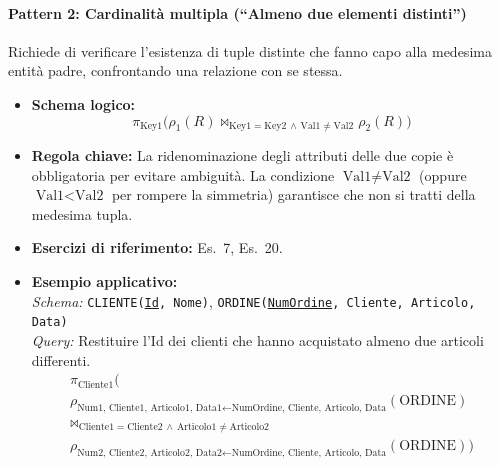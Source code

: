 \documentclass[12pt]{extarticle}
\begin{document}
\paragraph{Pattern 2: Cardinalità multipla (``Almeno due elementi distinti'')}
Richiede di verificare l'esistenza di tuple distinte che fanno capo alla medesima entità padre, confrontando una relazione con se stessa.
\begin{itemize}
    \item \textbf{Schema logico:}
    \[
    \pi_{\text{Key1}} \big( \rho_1(R) \bowtie_{\text{Key1} = \text{Key2} \,\land\, \text{Val1} \neq \text{Val2}} \rho_2(R) \big)
    \]
    \item \textbf{Regola chiave:} La ridenominazione degli attributi delle due copie è obbligatoria per evitare ambiguità. La condizione $\text{Val1} \neq \text{Val2}$ (oppure $\text{Val1} < \text{Val2}$ per rompere la simmetria) garantisce che non si tratti della medesima tupla.
    \item \textbf{Esercizi di riferimento:} Es.~7, Es.~20.
    \item \textbf{Esempio applicativo:}\\
    \textit{Schema:} \texttt{CLIENTE(\underline{Id}, Nome)}, \texttt{ORDINE(\underline{NumOrdine}, Cliente, Articolo, Data)}\\
    \textit{Query:} Restituire l'Id dei clienti che hanno acquistato almeno due articoli differenti.
    \[
    \begin{gathered}
    \pi_{\text{Cliente1}} \Big( \\
    \rho_{\text{Num1, Cliente1, Articolo1, Data1} \leftarrow \text{NumOrdine, Cliente, Articolo, Data}}(\text{ORDINE}) \\
    \bowtie_{\text{Cliente1} = \text{Cliente2} \,\land\, \text{Articolo1} \neq \text{Articolo2}} \\
    \rho_{\text{Num2, Cliente2, Articolo2, Data2} \leftarrow \text{NumOrdine, Cliente, Articolo, Data}}(\text{ORDINE}) \Big)
    \end{gathered}
    \]
\end{itemize}

\end{document}
